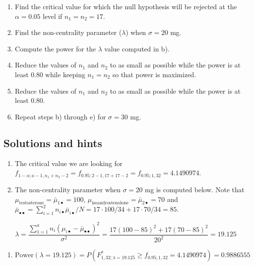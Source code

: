 \documentclass[
]{article}
\providecommand{\tightlist}{%
  \setlength{\itemsep}{0pt}\setlength{\parskip}{0pt}}
\begin{document}
\begin{enumerate}
\def\labelenumi{\alph{enumi})}
\item
  Find the critical value for which the null hypothesis will be rejected at the \(\alpha = 0.05\) level if \(n_1=n_2 = 17\).
\item
  Find the non-centrality parameter (\(\lambda\)) when \(\sigma = 20\) mg.
\item
  Compute the power for the \(\lambda\) value computed in b).
\item
  Reduce the values of \(n_1\) and \(n_2\) to as small as possible while the power is at least 0.80 while keeping \(n_1 = n_2\) so that power is maximized.
\item
  Reduce the values of \(n_1\) and \(n_2\) to as small as possible while the power is at least 0.80.
\item
  Repeat steps b) through e) for \(\sigma = 30\) mg.
\end{enumerate}

\hypertarget{solutions-and-hints}{%
\subsection*{Solutions and hints}\label{solutions-and-hints}}

\begin{enumerate}
\def\labelenumi{\alph{enumi})}
\item
  The critical value we are looking for \(f_{1 - \alpha; a - 1, n_1 + n_2 -2} = f_{0.95; 2 - 1, 17 + 17 -2} = f_{0.95; 1, 32} = 4.1490974\).
\item
  The non-centrality parameter when \(\sigma = 20\) mg is computed below. Note that \(\mu_{\text{testosterone}} = \bar{\mu}_{1\bullet} = 100\), \(\mu_{\text{isoandrostenolone}} = \bar{\mu}_{2\bullet} = 70\) and \(\bar{\mu}_{\bullet\bullet}=\sum_{i=1}^{2}n_{i\bullet}\bar{\mu}_{i\bullet}/N= 17\cdot 100/34 + 17\cdot 70/34 = 85.\)
\end{enumerate}

\begin{equation*}
\lambda = \frac{\sum_{1 = 1}^an_i(\mu_{i\bullet} - \bar{\mu}_{\bullet\bullet})^2}{\sigma^2} = \frac{17(100 - 85)^2 + 17(70 - 85)^2}{20^2} = 19.125
\end{equation*}

\begin{enumerate}
\def\labelenumi{\alph{enumi})}
\setcounter{enumi}{2}
\tightlist
\item
  \(\text{Power}(\lambda = 19.125) = P(F^*_{1, 32; \lambda = 19.125} \geq f_{0.95; 1, 32} = 4.1490974) = 0.9886555\)
\end{enumerate}
\end{document}
